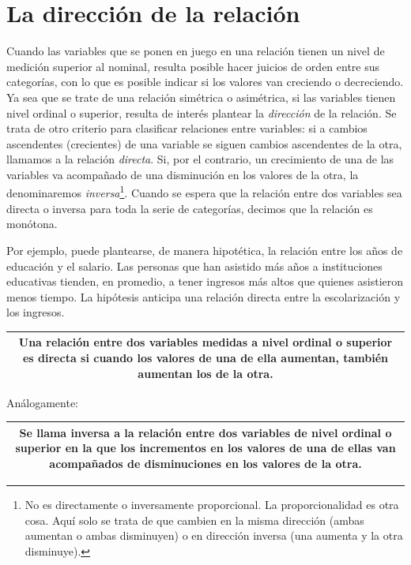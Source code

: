 \documentclass[]{book}
\let\rmarkdownfootnote\footnote%
\def\footnote{\protect\rmarkdownfootnote}
\begin{document}
\hypertarget{la-direccion-de-la-relacion}{%
\section{La dirección de la relación}\label{la-direccion-de-la-relacion}}

Cuando las variables que se ponen en juego en una relación tienen un
nivel de medición superior al nominal, resulta posible hacer juicios de orden entre sus categorías, con lo que es posible indicar si los valores
van creciendo o decreciendo. Ya sea que se trate de una relación
simétrica o asimétrica, si las variables tienen nivel ordinal o
superior, resulta de interés plantear la \emph{dirección} de la relación.
Se trata de otro criterio para clasificar relaciones entre variables: si
a cambios ascendentes (crecientes) de una variable se siguen cambios
ascendentes de la otra, llamamos a la relación \emph{directa}. Si, por el
contrario, un crecimiento de una de las variables va acompañado de una
disminución en los valores de la otra, la denominaremos
\emph{inversa}\footnote{No es directamente o inversamente proporcional. La proporcionalidad es otra cosa. Aquí solo se trata de que cambien en la misma dirección (ambas aumentan o ambas disminuyen) o en dirección inversa (una aumenta y la otra disminuye).}. Cuando se espera que la relación entre dos variables
sea directa o inversa para toda la serie de categorías, decimos que la
relación es monótona.

Por ejemplo, puede plantearse, de manera hipotética, la relación entre
los años de educación y el salario. Las personas que han asistido más
años a instituciones educativas tienden, en promedio, a tener ingresos
más altos que quienes asistieron menos tiempo. La hipótesis anticipa una
relación directa entre la escolarización y los ingresos.

\begin{longtable}[]{@{}c@{}}
\toprule
\endhead
\begin{minipage}[t]{0.97\columnwidth}\centering
Una relación entre dos variables medidas a nivel ordinal o superior es \textbf{directa} si cuando los valores de una de ella aumentan, también aumentan los de la otra.\strut
\end{minipage}\tabularnewline
\bottomrule
\end{longtable}

Análogamente:

\begin{longtable}[]{@{}c@{}}
\toprule
\endhead
\begin{minipage}[t]{0.97\columnwidth}\centering
Se llama \textbf{inversa} a la relación entre dos variables de nivel ordinal o superior en la que los incrementos en los valores de una de ellas van acompañados de disminuciones en los valores de la otra.\strut
\end{minipage}\tabularnewline
\bottomrule
\end{longtable}
\end{document}
